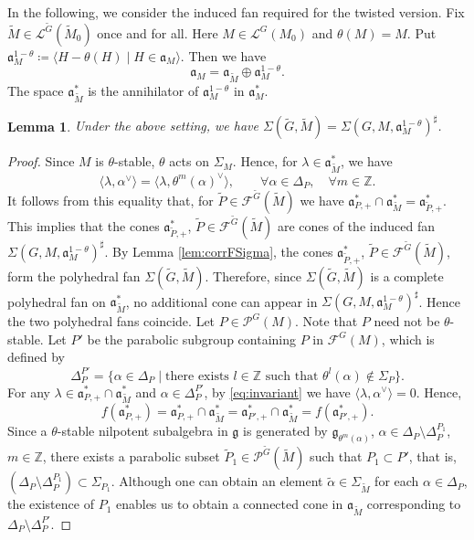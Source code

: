 \documentclass[12pt]{amsart}
\theoremstyle{definition}
\theoremstyle{plain}
\newtheorem{lemma}[definition]{Lemma}
\theoremstyle{remark}
\def\Z{\mathbb{Z}}%
\newcommand{\fa}{\mathfrak{a}}
\newcommand{\fg}{\mathfrak{g}}
\newcommand{\cF}{\mathcal{F}}
\newcommand{\cL}{\mathcal{L}}
\newcommand{\cP}{\mathcal{P}}
\numberwithin{equation}{section}
\newcommand{\tG}{\widetilde{G}}
\newcommand{\tM}{\widetilde{M}}
\newcommand{\tP}{\widetilde{P}}
\newcommand{\talpha}{\widetilde{\alpha}}
\begin{document}
In the following, we consider the induced fan required for the twisted version.
Fix $\tM\in\cL^{\tG}(\tM_0)$ once and for all. 
Here $M\in\cL^G(M_0)$ and $\theta(M)=M$. 
Put $\fa_M^{1-\theta}\coloneqq\langle H-\theta(H)\mid H\in\fa_M\rangle$. 
Then we have
\[
\fa_M=\fa_{\tM}\oplus \fa_M^{1-\theta}.
\]
The space $\fa_{\tM}^*$ is the annihilator of $\fa_M^{1-\theta}$ in $\fa_M^*$. %
\begin{lemma}\label{lem:indfun2}
Under the above setting, we have $\Sigma(\tG,\tM)=\Sigma(G,M,\fa_M^{1-\theta})^\sharp$.
\end{lemma}
\begin{proof}
Since $M$ is $\theta$-stable, $\theta$ acts on $\Sigma_M$. 
Hence, for $\lambda\in\fa_{\tM}^*$, we have
\begin{equation*}\label{eq:invariant}
\langle \lambda,\alpha^\vee\rangle=\langle\lambda, \theta^m(\alpha)^\vee\rangle,\qquad \forall\alpha\in\Delta_P,\quad \forall m\in\Z .  %
\end{equation*}
It follows from this equality that, for $\tP\in\cF^{\tG}(\tM)$ we have $\fa_{P,+}^*\cap \fa_{\tM}^*=\fa_{\tP,+}^*$. 
This implies that the cones $\fa_{\tP,+}^*$, $\tP\in\cF^{\tG}(\tM)$ are cones of the induced fan $\Sigma(G,M,\fa_M^{1-\theta})^\sharp$. 
By Lemma \ref{lem:corrFSigma}, the cones $\fa_{\tP,+}^*$, $\tP\in \cF^{\tG}(\tM)$, form the polyhedral fan $\Sigma(\tG,\tM)$. 
Therefore, since $\Sigma(\tG,\tM)$ is a complete polyhedral fan on $\fa_{\tM}^*$, no additional cone can appear in $\Sigma(G,M,\fa_M^{1-\theta})^\sharp$. 
Hence the two polyhedral fans coincide.
Let $P\in\cP^G(M)$. Note that $P$ need not be $\theta$-stable.
Let $P'$ be the parabolic subgroup containing $P$ in $\cF^G(M)$, which is defined by
\[
\Delta_P^{P'}=\{ \alpha\in\Delta_P \mid \text{there exists $l\in\Z$ such that $\theta^l(\alpha)\notin\Sigma_P$}  \} .
\]
For any $\lambda\in \fa^*_{P,+}\cap \fa^*_{\tM}$ and $\alpha\in\Delta_P^{P'}$, by \eqref{eq:invariant} we have $\langle\lambda,\alpha^\vee\rangle= 0$. 
Hence,
\[
f(\fa^*_{P,+})=\fa^*_{P,+}\cap \fa^*_{\tM}=\fa^*_{P',+}\cap \fa^*_{\tM}=f(\fa^*_{P',+}).
\]
Since a $\theta$-stable nilpotent subalgebra in $\fg$ is generated by $\fg_{\theta^m(\alpha)}$, $\alpha\in\Delta_P\setminus\Delta_P^{P_1}$, $m\in\Z$, there exists a parabolic subset $\tP_1\in\cP^{\tG}(\tM)$ such that $P_1\subset P'$, that is, $(\Delta_P\setminus\Delta_P^{P_1}) \subset\Sigma_{P_1}$.
Although one can obtain an element $\talpha\in\Sigma_{\tM}$ for each $\alpha\in\Delta_P$, the existence of $P_1$ enables us to obtain a connected cone in $\fa_{\tM}$ corresponding to $\Delta_P\setminus\Delta_P^{P'}$.


\end{proof}
\end{document}
